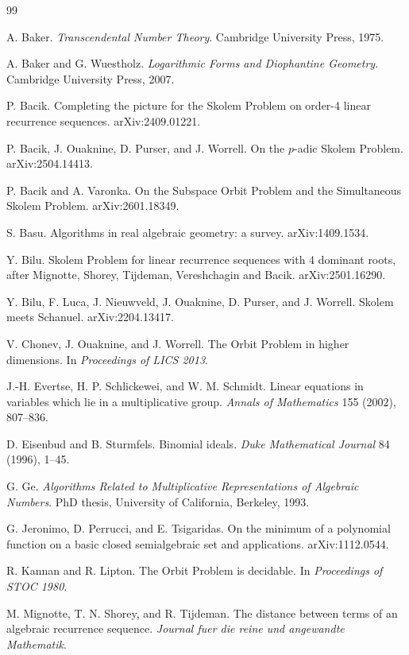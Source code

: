 \documentclass[11pt]{article}
\begin{document}
\begin{thebibliography}{99}

A. Baker.
\emph{Transcendental Number Theory}.
Cambridge University Press, 1975.

A. Baker and G. Wuestholz.
\emph{Logarithmic Forms and Diophantine Geometry}.
Cambridge University Press, 2007.

P. Bacik.
Completing the picture for the Skolem Problem on order-4 linear recurrence sequences.
arXiv:2409.01221.

P. Bacik, J. Ouaknine, D. Purser, and J. Worrell.
On the \(p\)-adic Skolem Problem.
arXiv:2504.14413.

P. Bacik and A. Varonka.
On the Subspace Orbit Problem and the Simultaneous Skolem Problem.
arXiv:2601.18349.

S. Basu.
Algorithms in real algebraic geometry: a survey.
arXiv:1409.1534.

Y. Bilu.
Skolem Problem for linear recurrence sequences with 4 dominant roots, after Mignotte, Shorey, Tijdeman, Vereshchagin and Bacik.
arXiv:2501.16290.

Y. Bilu, F. Luca, J. Nieuwveld, J. Ouaknine, D. Purser, and J. Worrell.
Skolem meets Schanuel.
arXiv:2204.13417.

V. Chonev, J. Ouaknine, and J. Worrell.
The Orbit Problem in higher dimensions.
In \emph{Proceedings of LICS 2013}.

J.-H. Evertse, H. P. Schlickewei, and W. M. Schmidt.
Linear equations in variables which lie in a multiplicative group.
\emph{Annals of Mathematics} 155 (2002), 807--836.

D. Eisenbud and B. Sturmfels.
Binomial ideals.
\emph{Duke Mathematical Journal} 84 (1996), 1--45.

G. Ge.
\emph{Algorithms Related to Multiplicative Representations of Algebraic Numbers}.
PhD thesis, University of California, Berkeley, 1993.

G. Jeronimo, D. Perrucci, and E. Tsigaridas.
On the minimum of a polynomial function on a basic closed semialgebraic set and applications.
arXiv:1112.0544.

R. Kannan and R. Lipton.
The Orbit Problem is decidable.
In \emph{Proceedings of STOC 1980}.

M. Mignotte, T. N. Shorey, and R. Tijdeman.
The distance between terms of an algebraic recurrence sequence.
\emph{Journal fuer die reine und angewandte Mathematik}.


\end{thebibliography}
\end{document}
